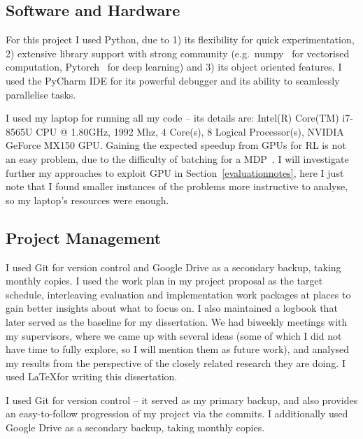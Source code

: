 \subsection{Software and Hardware}


For this project I used Python, due to 1) its flexibility for quick experimentation, 2) extensive library support with strong community (e.g.\ numpy~\cite{harris2020numpy} for vectorised computation, Pytorch~\cite{paszke2019pytorch} for deep learning) and 3) its object oriented features. I used the PyCharm IDE for its powerful debugger and its ability to seamlessly parallelise tasks.


I used my laptop for running all my code -- its details are: Intel(R) Core(TM) i7-8565U CPU @ 1.80GHz, 1992 Mhz, 4 Core(s), 8 Logical Processor(s), NVIDIA GeForce MX150 GPU. Gaining the expected speedup from GPUs for RL is not an easy problem, due to the difficulty of batching for a MDP~\cite{stooke2018gpudeepRL}. I will investigate further my approaches to exploit GPU in Section~\ref{evaluationnotes}, here I just note that I found smaller instances of the problems more instructive to analyse, so my laptop's resources were enough.


\subsection{Project Management}

I used Git for version control and Google Drive as a secondary backup, taking monthly copies. I used the work plan in my project proposal as the target schedule, interleaving evaluation and implementation work packages at places to gain better insights about what to focus on. I also maintained a logbook that later served as the baseline for my dissertation. We had biweekly meetings with my supervisors, where we came up with several ideas (some of which I did not have time to fully explore, so I will mention them as future work), and analysed my results from the perspective of the closely related research they are doing. I used \LaTeX for writing this dissertation.

\iffalse
I used Git for version control -- it served as my primary backup, and also provides an easy-to-follow progression of my project via the commits. I additionally used Google Drive as a secondary backup, taking monthly copies. 

